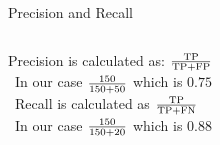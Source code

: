 \documentclass[handout]{beamer}
\begin{document}
\begin{frame}{Precision and Recall} 
	
	\begin{columns}
		Precision is calculated as: \(\frac{\rm{TP}}{\rm{TP}+\rm{FP}}\) \\\
		In our case \(\frac{\rm{150}}{\rm{150}+\rm{50}}\) which is \(0.75\) \\\
		Recall is calculated as \(\frac{\rm{TP}}{\rm{TP}+\rm{FN}}\) \\\
		In our case \(\frac{\rm{150}}{\rm{150}+\rm{20}}\) which is \(0.88\)
	\end{columns}
	
	
	
	
\end{frame}
\end{document}
